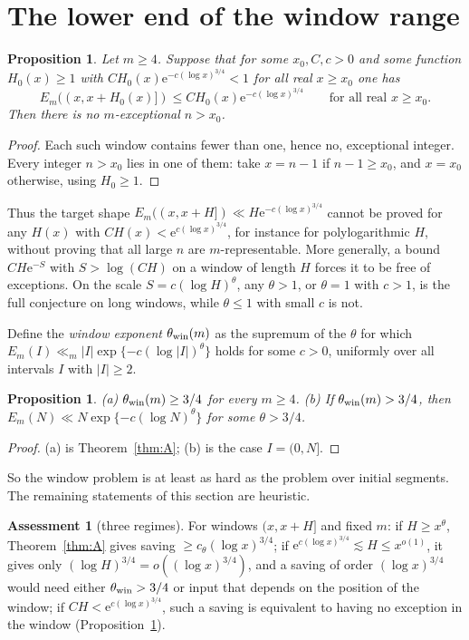 \documentclass[10pt,reqno]{amsart}
\newtheorem{proposition}[theorem]{Proposition}
\newtheorem{introprop}[introthm]{Proposition}
\theoremstyle{definition}
\newtheorem{assessment}[theorem]{Assessment}
\newcommand{\e}{\mathrm e}
\begin{document}
\section{The lower end of the window range}\label{sec:lowerend}
\begin{introprop}\label{prop:E}
Let $m\geq4$.  Suppose that for some $x_0,C,c>0$ and some function
$H_0(x)\geq1$ with $CH_0(x)\e^{-c(\log x)^{3/4}}<1$ for all real
$x\geq x_0$ one has
\[
 E_m((x,x+H_0(x)])\leq CH_0(x)\e^{-c(\log x)^{3/4}}\qquad\text{for all real }x\geq x_0.
\]
Then there is no $m$-exceptional $n>x_0$.
\end{introprop}

\begin{proof}
Each such window contains fewer than one, hence no, exceptional integer.
Every integer $n>x_0$ lies in one of them: take $x=n-1$ if
$n-1\geq x_0$, and $x=x_0$ otherwise, using $H_0\geq1$.
\end{proof}

Thus the target shape $E_m((x,x+H])\ll H\e^{-c(\log x)^{3/4}}$ cannot be
proved for any $H(x)$ with $CH(x)<\e^{c(\log x)^{3/4}}$, for instance for
polylogarithmic $H$, without proving that all large $n$ are
$m$-representable.  More generally, a bound $CH\e^{-S}$ with
$S>\log(CH)$ on a window of length $H$ forces it to be free of
exceptions.  On the scale $S=c(\log H)^\theta$, any $\theta>1$, or
$\theta=1$ with $c>1$, is the full conjecture on long windows, while
$\theta\leq1$ with small $c$ is not.

Define the \emph{window exponent} $\theta_{\rm win}(m)$ as the supremum
of the $\theta$ for which $E_m(I)\ll_m|I|\exp\{-c(\log|I|)^\theta\}$
holds for some $c>0$, uniformly over all intervals $I$ with $|I|\geq2$.

\begin{proposition}\label{prop:win}
\textup{(a)} $\theta_{\rm win}(m)\geq3/4$ for every $m\geq4$.
\textup{(b)} If $\theta_{\rm win}(m)>3/4$, then
$E_m(N)\ll N\exp\{-c(\log N)^\theta\}$ for some $\theta>3/4$.
\end{proposition}

\begin{proof}
(a) is Theorem~\ref{thm:A}; (b) is the case $I=(0,N]$.
\end{proof}

So the window problem is at least as hard as the problem over initial
segments.  The remaining statements of this section are heuristic.

\begin{assessment}[three regimes]\label{ass:regimes}
For windows $(x,x+H]$ and fixed $m$:
if $H\geq x^\theta$, Theorem~\ref{thm:A} gives saving
$\geq c_\theta(\log x)^{3/4}$;
if $\e^{c(\log x)^{3/4}}\lesssim H\leq x^{o(1)}$, it gives only
$(\log H)^{3/4}=o((\log x)^{3/4})$, and a saving of order
$(\log x)^{3/4}$ would need either $\theta_{\rm win}>3/4$ or input that
depends on the position of the window;
if $CH<\e^{c(\log x)^{3/4}}$, such a saving is equivalent to having no
exception in the window (Proposition~\ref{prop:E}).
\end{assessment}
\end{document}
